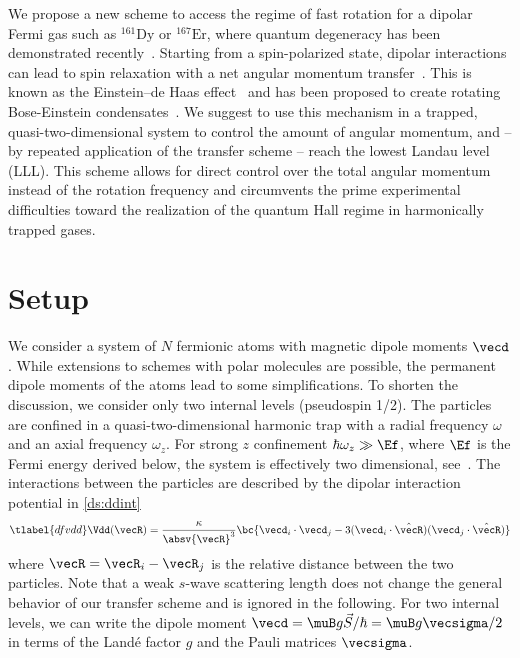 We propose a new scheme to access the regime of fast rotation for a dipolar Fermi gas such as $^{161}\text{Dy}$ or $^{167}\text{Er}$, where quantum degeneracy has been demonstrated recently~\cite{Lu2012,Aikawa2014}. Starting from a spin-polarized state, dipolar interactions can lead to spin relaxation with a net angular momentum transfer~\cite{Hensler2003}. This is known as the Einstein--de Haas effect~\cite{Einstein1915} and has been proposed to create rotating Bose-Einstein condensates~\cite{Santos2006,Kawaguchi2006}. We suggest to use this mechanism in a trapped, quasi-two-dimensional system to control the amount of angular momentum, and -- by repeated application of the transfer scheme -- reach the lowest Landau level (LLL). This scheme allows for direct control over the total angular momentum instead of the rotation frequency and circumvents the prime experimental difficulties toward the realization of the quantum Hall regime in harmonically trapped gases.

\section{Setup}

We consider a system of $N$ fermionic atoms with magnetic dipole moments $\vecd$. While extensions to schemes with polar molecules are possible, the permanent dipole moments of the atoms lead to some simplifications.
To shorten the discussion, we consider only two internal levels (pseudospin 1/2). The particles are confined in a quasi-two-dimensional harmonic trap with a radial frequency $\omega$ and an axial frequency $\omega_z$. For strong $z$ confinement $\hbar\omega_z \gg \Ef$, where $\Ef$ is the Fermi energy derived below, the system is effectively two dimensional, see~.
The interactions between the particles are described by the dipolar interaction potential in \cref{ds:ddint}
\begin{align} \tlabel{dfvdd}
\Vdd(\vecR) = \frac{\kappa}{\absv{\vecR}^3} \bc{ \vecd_i \cdot \vecd_j -3 (\vecd_i \cdot \hat{\vecR})(\vecd_j \cdot \hat{\vecR}) }
\end{align}
where $\vecR=\vecR_i-\vecR_j$ is the relative distance between the two particles.
Note that a weak $s$-wave scattering length does not change the general behavior of our transfer scheme and is ignored in the following.
For two internal levels, we can write the
dipole moment $\vecd =  \muB g \vec{S} / \hbar = \muB g \vecsigma/2$ in terms of the Land\'e factor $g$ and the Pauli matrices $\vecsigma$.

